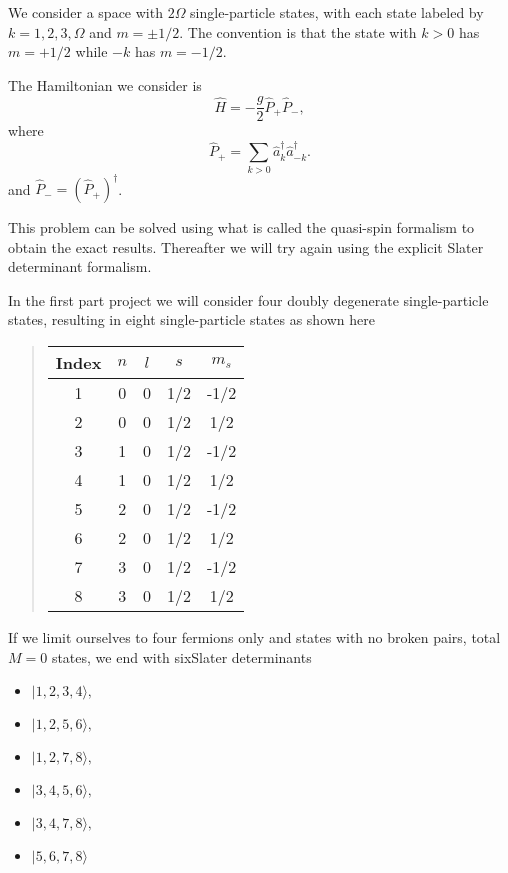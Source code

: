 We consider a space with $2\Omega$ single-particle states, with each 
state labeled by 
$k = 1, 2, 3, \Omega$ and $m = \pm 1/2$. The convention is that 
the state with $k>0$ has $m = + 1/2$ while $-k$ has $m = -1/2$.


The Hamiltonian we consider is 
\[
\hat{H} = -\frac{g}{2} \hat{P}_+ \hat{P}_-,
\]
where
\[
\hat{P}_+ = \sum_{k > 0} \hat{a}^\dagger_k \hat{a}^\dagger_{-{k}}.
\]
and $\hat{P}_- = ( \hat{P}_+)^\dagger$.

This problem can be solved using what is called the quasi-spin formalism to obtain the 
exact results. Thereafter we will try again using the explicit Slater determinant formalism.


In the first part project we will consider four doubly degenerate single-particle states, resulting in eight single-particle states as shown here

\begin{quote}
\begin{tabular}{ccccc}
\hline
\multicolumn{1}{c}{ Index } & \multicolumn{1}{c}{ $n$ } & \multicolumn{1}{c}{ $l$ } & \multicolumn{1}{c}{ $s$ } & \multicolumn{1}{c}{ $m_s$ } \\
\hline
1     & 0   & 0   & 1/2 & -1/2  \\
2     & 0   & 0   & 1/2 & 1/2   \\
3     & 1   & 0   & 1/2 & -1/2  \\
4     & 1   & 0   & 1/2 & 1/2   \\
5     & 2   & 0   & 1/2 & -1/2  \\
6     & 2   & 0   & 1/2 & 1/2   \\
7     & 3   & 0   & 1/2 & -1/2  \\
8     & 3   & 0   & 1/2 & 1/2   \\
\hline
\end{tabular}
\end{quote}

\noindent

If we limit ourselves to four fermions only and states with no broken pairs, 
total $M=0$ states, we end with  sixSlater  determinants

\begin{itemize}
\item $|           1,           2 ,          3         ,       4  \rangle , $

\item $|            1      ,     2        ,        5         ,       6 \rangle , $

\item $|            1         ,       2     ,           7         ,       8  \rangle , $

\item $|            3        ,        4      ,          5          ,      6  \rangle , $

\item $|            3        ,        4      ,          7         ,       8  \rangle , $

\item $|            5        ,        6     ,           7     ,           8  \rangle $
\end{itemize}

